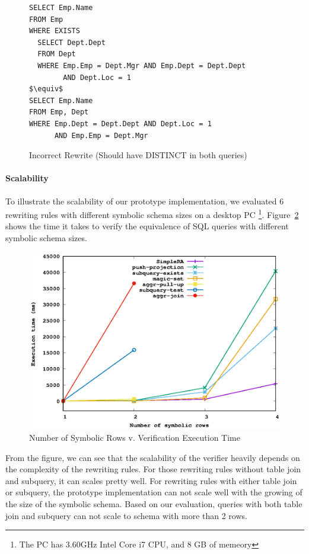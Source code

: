 \begin{figure}[!htb]
\begin{lstlisting}[style=sql,xleftmargin=.2\textwidth,mathescape=true]
SELECT Emp.Name
FROM Emp
WHERE EXISTS 
  SELECT Dept.Dept
  FROM Dept
  WHERE Emp.Emp = Dept.Mgr AND Emp.Dept = Dept.Dept
        AND Dept.Loc = 1
$\equiv$
SELECT Emp.Name
FROM Emp, Dept
WHERE Emp.Dept = Dept.Dept AND Dept.Loc = 1 
      AND Emp.Emp = Dept.Mgr
\end{lstlisting}
\caption{Incorrect Rewrite (Should have DISTINCT in both queries)}
\label{fig:push-proj}
\end{figure}

\paragraph{Scalability}
To illustrate the scalability of our prototype implementation, we evaluated
6 rewriting rules with different symbolic schema sizes on a desktop PC
\footnote{The PC has 3.60GHz Intel Core i7 CPU, and 8 GB of memeory}.
Figure~\ref{fig:scale} shows the time it takes to verify the equivalence of SQL queries
with different symbolic schema sizes.

\begin{figure}[!htb]
  \centering
  \includegraphics[width=0.7\linewidth]{scale.eps}
  \caption{Number of Symbolic Rows v. Verification Execution Time}
  \label{fig:scale}
\end{figure}

From the figure, we can see that the scalability of the verifier heavily depends 
on the complexity of the rewriting rules.
For those rewriting rules without table join and subquery, it can scales pretty well.
For rewriting rules with either table join or subquery, the prototype implementation can 
not scale well with the growing of the size of the symbolic schema.
Based on our evaluation, queries with both table join and subquery can not scale to schema with
more than 2 rows.

